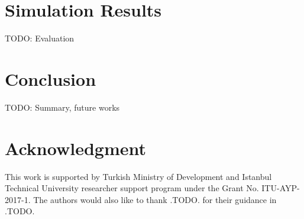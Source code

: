 \documentclass[conference]{IEEEtran}
\begin{document}
\section{Simulation Results}
TODO: Evaluation


\section{Conclusion}
TODO: Summary, future works
\cite{7815384} \cite{7803607} \cite{7996384} \cite{8090518} \cite{s17061193} \cite{8267219} \cite{8430542} \cite{8319183} \cite{8480649} \cite{AN1200.22} \cite{Bor:2016:LLW:2988287.2989163} \cite{8406255} \cite{DBLP:journals/corr/abs-1802-10338} \cite{finnegan2018comparative}


\section*{Acknowledgment}
This work is supported by Turkish Ministry of Development and Istanbul Technical University researcher support program under the Grant No. ITU-AYP-2017-1. The authors would also like to thank .TODO. for their guidance in .TODO.




\end{document}
